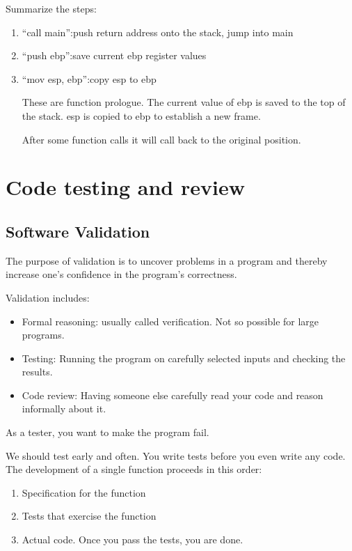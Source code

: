 \documentclass[letterpaper,12pt]{article}
\begin{document}
Summarize the steps:
\begin{enumerate}
      \item ``call main'':push return address onto the stack, jump into main
      \item ``push ebp'':save current ebp register values
      \item ``mov esp, ebp'':copy esp to ebp

            These are function prologue. The current value of ebp is saved to the top of
            the stack. esp is copied to ebp to establish a new frame.

            After some function calls it will call back to the original position.
\end{enumerate}

\section{Code testing and review}

\subsection{Software Validation}
The purpose of validation is to uncover problems in a program and thereby
increase one's confidence in the program's correctness.

Validation includes:
\begin{itemize}
      \item Formal reasoning: usually called verification. Not so possible for large
            programs.
      \item Testing: Running the program on carefully selected inputs and checking the
            results.
      \item Code review: Having someone else carefully read your code and reason informally
            about it.
\end{itemize}

As a tester, you want to make the program fail.

We should test early and often. You write tests before you even write any code.
The development of a single function proceeds in this order:
\begin{enumerate}
      \item Specification for the function
      \item Tests that exercise the function
      \item Actual code. Once you pass the tests, you are done.
\end{enumerate}
\end{document}
